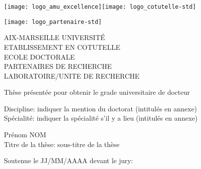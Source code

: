 \titlepage{}\selectfont{}
\vspace*{-2cm}
\begin{center}
	\begin{minipage}[c]{0.70\linewidth}
		\raggedright\texttt{[image: logo\_amu\_excellence]}\quad\texttt{[image: logo\_cotutelle-std]}
	\end{minipage}\hfill
	\begin{minipage}[c]{0.30\linewidth}
		\raggedleft\texttt{[image: logo\_partenaire-std]}
	\end{minipage}\hfill
\end{center}
\begin{flushleft}
	\vspace{0.2cm}
	\LARGE AIX-MARSEILLE UNIVERSITÉ\\
	\LARGE\textcolor{black!50}{ETABLISSEMENT EN COTUTELLE}\\
	\Large ECOLE DOCTORALE\\
	\vspace{0.2cm}
	\normalsize\textcolor{black!50}{PARTENAIRES DE RECHERCHE}\\
	\vspace{0.2cm}
	LABORATOIRE/UNITE DE RECHERCHE\\
    \begin{center}
		\vspace{2cm}
		Thèse présentée pour obtenir le grade universitaire de docteur\\
    \end{center}
	\vspace{0.5cm}
    Discipline: indiquer la mention du doctorat (intitulés en annexe)\\
    Spécialité: indiquer la spécialité s'il y a lieu (intitulés en annexe)\\
    \begin{center}
        \vspace{0.5cm}
        \Large Prénom NOM\\
        \vspace{1cm}
        \large Titre de la thèse: sous-titre de la thèse\\
    \end{center}
	\vspace{3.5cm}
    \normalsize Soutenue le JJ/MM/AAAA devant le jury:\\
\end{flushleft}
\vspace{0.4cm}
